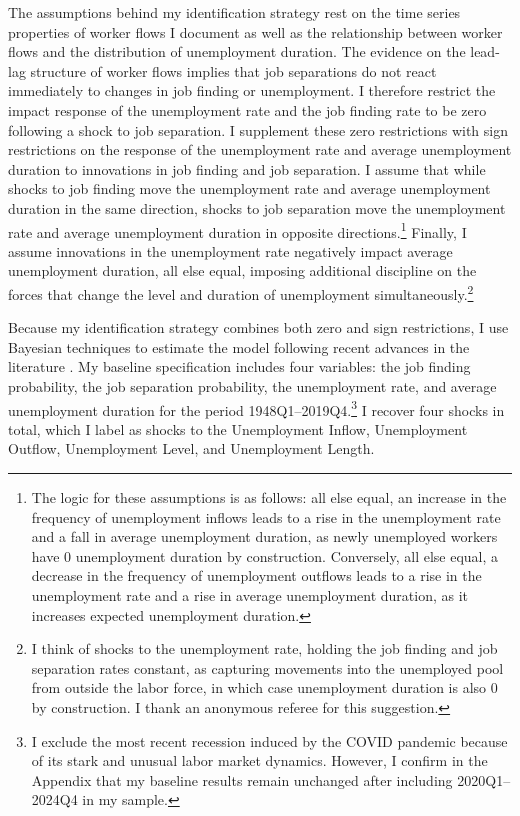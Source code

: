 \documentclass[12pt]{article}
\begin{document}
The assumptions behind my identification strategy rest on the time series properties of worker flows I document as well as the relationship between worker flows and the distribution of unemployment duration. The evidence on the lead-lag structure of worker flows implies that job separations do not react immediately to changes in job finding or unemployment. I therefore restrict the impact response of the unemployment rate and the job finding rate to be zero following a shock to job separation. I supplement these zero restrictions with sign restrictions on the response of the unemployment rate and average unemployment duration to innovations in job finding and job separation. I assume that while shocks to job finding move the unemployment rate and average unemployment duration in the same direction, shocks to job separation move the unemployment rate and average unemployment duration in opposite directions.\footnote{The logic for these assumptions is as follows: all else equal, an increase in the frequency of unemployment inflows leads to a rise in the unemployment rate and a fall in average unemployment duration, as newly unemployed workers have 0 unemployment duration by construction. Conversely, all else equal, a decrease in the frequency of unemployment outflows leads to a rise in the unemployment rate and a rise in average unemployment duration, as it increases expected unemployment duration.} Finally, I assume innovations in the unemployment rate negatively impact average unemployment duration, all else equal, imposing additional discipline on the forces that change the level and duration of unemployment simultaneously.\footnote{I think of shocks to the unemployment rate, holding the job finding and job separation rates constant, as capturing movements into the unemployed pool from outside the labor force, in which case unemployment duration is also 0 by construction. I thank an anonymous referee for this suggestion.}

Because my identification strategy combines both zero and sign restrictions, I use Bayesian techniques to estimate the model following recent advances in the literature \citep{Rubio:2010aa, Arias:2018aa}. My baseline specification includes four variables: the job finding probability, the job separation probability, the unemployment rate, and average unemployment duration for the period 1948Q1--2019Q4.\footnote{I exclude the most recent recession induced by the COVID pandemic because of its stark and unusual labor market dynamics. However, I confirm in the Appendix that my baseline results remain unchanged after including 2020Q1--2024Q4 in my sample.} I recover four shocks in total, which I label as shocks to the Unemployment Inflow, Unemployment Outflow, Unemployment Level, and Unemployment Length.
\end{document}
